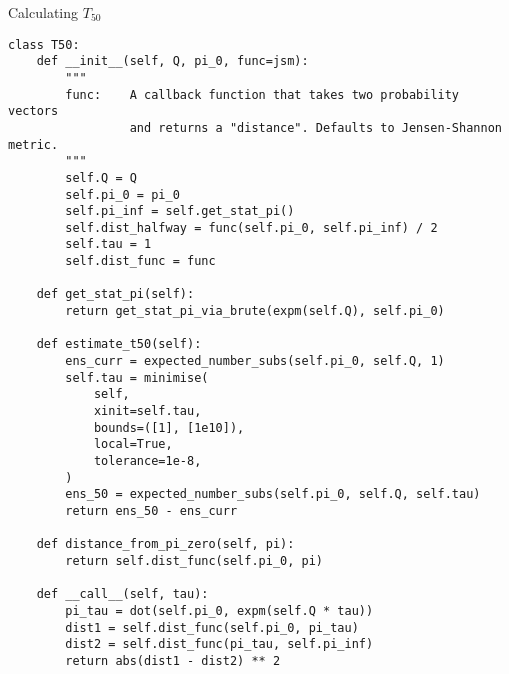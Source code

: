 \begin{algorithm}[ht!]
\caption[Algorithm]{Calculating $T_{50}$}
\label{alg:t50}
\begin{verbatim}
class T50:
    def __init__(self, Q, pi_0, func=jsm):
        """
        func:    A callback function that takes two probability vectors
                 and returns a "distance". Defaults to Jensen-Shannon metric.
        """
        self.Q = Q
        self.pi_0 = pi_0
        self.pi_inf = self.get_stat_pi()
        self.dist_halfway = func(self.pi_0, self.pi_inf) / 2
        self.tau = 1
        self.dist_func = func

    def get_stat_pi(self):
        return get_stat_pi_via_brute(expm(self.Q), self.pi_0)

    def estimate_t50(self):
        ens_curr = expected_number_subs(self.pi_0, self.Q, 1)
        self.tau = minimise(
            self,
            xinit=self.tau,
            bounds=([1], [1e10]),
            local=True,
            tolerance=1e-8,
        )
        ens_50 = expected_number_subs(self.pi_0, self.Q, self.tau)
        return ens_50 - ens_curr

    def distance_from_pi_zero(self, pi):
        return self.dist_func(self.pi_0, pi)

    def __call__(self, tau):
        pi_tau = dot(self.pi_0, expm(self.Q * tau))
        dist1 = self.dist_func(self.pi_0, pi_tau)
        dist2 = self.dist_func(pi_tau, self.pi_inf)
        return abs(dist1 - dist2) ** 2
\end{verbatim}
\end{algorithm}
